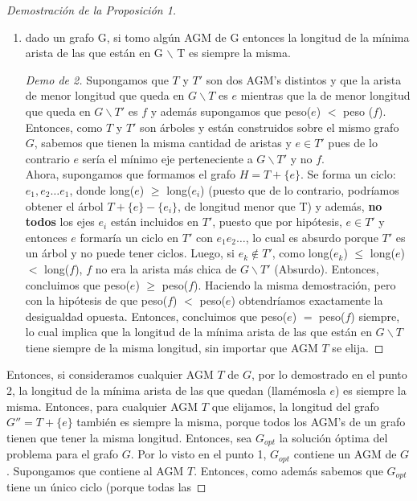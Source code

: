 \documentclass[11pt, a4paper, twoside]{article}
\begin{document}
\begin{proof}[Demostración de la Proposición 1]
\begin{enumerate}
  \item dado un grafo G, si tomo algún AGM de G entonces la longitud de la mínima 
        arista de las que están en G $\backslash$ T es siempre la misma.
        
        \begin{proof}[Demo de 2]
		Supongamos que $T$ y $T'$ son dos AGM's distintos y que la arista de menor longitud 
		que queda en $G \backslash T$ es $e$ mientras que la de menor longitud que queda en
		$G \backslash T'$ es $f$ y además supongamos que peso($e$) $<$ peso ($f$). Entonces,
		como $T$ y $T'$ son árboles y están construidos sobre el mismo grafo $G$, sabemos que
		tienen la misma cantidad de aristas y $e \in T'$ pues de lo contrario $e$ sería el mínimo
		eje perteneciente a $G \backslash T'$ y no $f$.\\
		Ahora, supongamos que formamos el grafo 
		$H = T + \{e\}$. Se forma un ciclo: $e_{1}, e_{2} \dots e_{1}$, donde long($e$) $\geq$ 
		long($e_{i}$) (puesto que de lo contrario, podríamos obtener el árbol $T + \{e\} - \{e_{i}\}$, de 
		longitud menor que T) y además, \textbf{no todos} 
		los ejes $e_{i}$ están incluidos en $T'$, puesto que por hipótesis, $e \in T'$ y entonces
		$e$ formaría un ciclo en $T'$ con $e_{1} e_{2} \dots$, lo cual es absurdo porque $T'$ es un
		árbol y no puede tener ciclos.
		Luego, si $e_{k} \not\in T'$, como long($e_{k}$) $\leq$ long($e$) $<$ long($f$), $f$ no 
		era la arista más chica de $G \backslash T'$ (Absurdo). Entonces, concluimos que 
		peso($e$) $\geq$ peso($f$). Haciendo la misma demostración, pero con la hipótesis de que
		peso($f$) $<$ peso($e$) obtendríamos exactamente la desigualdad opuesta. 
		Entonces, concluimos que peso($e$) $=$ peso($f$) siempre, lo cual implica que 
		la longitud de la mínima arista de las que están en $G \backslash T$ tiene siempre de
		la misma longitud, sin importar que AGM $T$ se elija.
		\end{proof}
\end{enumerate}
Entonces, si consideramos cualquier AGM $T$ de $G$, por lo demostrado en el punto 2, la
longitud de la mínima arista de las que quedan (llamémosla $e$) es siempre la misma.
Entonces, para cualquier AGM $T$ que elijamos, la longitud del grafo $ G'' = T + \{e\} $
también es siempre la misma, porque todos los AGM's de un grafo tienen que tener la misma
longitud. Entonces, sea $G_{opt}$ la solución óptima del problema para el grafo $G$. 
Por lo visto en el punto 1, $G_{opt}$ contiene un AGM de $G$. Supongamos que contiene 
al AGM $T$. Entonces, como además sabemos que $G_{opt}$ tiene un único ciclo (porque todas las 

\end{proof}
\end{document}
